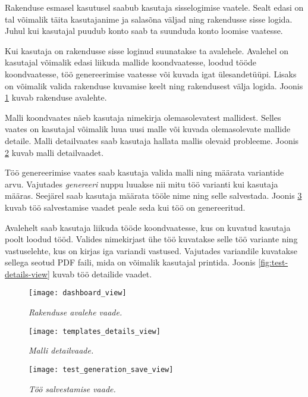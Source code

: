 Rakenduse esmasel kasutusel saabub kasutaja sisselogimise vaatele. Sealt edasi on tal võimalik täita kasutajanime ja salasõna väljad ning rakendusse sisse logida. Juhul kui kasutajal puudub konto saab ta suunduda konto loomise vaatesse.

Kui kasutaja on rakendusse sisse loginud suunatakse ta avalehele. Avalehel on kasutajal võimalik edasi liikuda mallide koondvaatesse, loodud tööde koondvaatesse, töö genereerimise vaatesse või kuvada igat ülesandetüüpi. Lisaks on võimalik valida rakenduse kuvamise keelt ning rakendusest välja logida. Joonis \ref{fig:dashboard-view} kuvab rakenduse avalehte.

Malli koondvaates näeb kasutaja nimekirja olemasolevatest mallidest. Selles vaates on kasutajal võimalik luua uusi malle või kuvada olemasolevate mallide detaile. Malli detailvaates saab kasutaja hallata mallis olevaid probleeme. Joonis \ref{fig:template-details-view} kuvab malli detailvaadet.

Töö genereerimise vaates saab kasutaja valida malli ning määrata variantide arvu. Vajutades \textit{genereeri} nuppu luuakse nii mitu töö varianti kui kasutaja määras. Seejärel saab kasutaja määrata tööle nime ning selle salvestada. Joonis \ref{fig:test-generation-save-view} kuvab töö salvestamise vaadet peale seda kui töö on genereeritud.

Avalehelt saab kasutaja liikuda tööde koondvaatesse, kus on kuvatud kasutaja poolt loodud tööd. Valides nimekirjast ühe töö kuvatakse selle töö variante ning vastuselehte, kus on kirjas iga variandi vastused. Vajutades variandile kuvatakse sellega seotud PDF faili, mida on võimalik kasutajal printida. Joonis \ref{fig:test-details-view} kuvab töö detailide vaadet.

\begin{figure}[H]
    \centering
    \texttt{[image: dashboard\_view]}
    \caption{\emph{Rakenduse avalehe vaade.}}
    \label{fig:dashboard-view}
\end{figure}

\begin{figure}[H]
    \centering
    \texttt{[image: templates\_details\_view]}
    \caption{\emph{Malli detailvaade.}}
    \label{fig:template-details-view}
\end{figure}

\begin{figure}[H]
    \centering
    \texttt{[image: test\_generation\_save\_view]}
    \caption{\emph{Töö salvestamise vaade.}}
    \label{fig:test-generation-save-view}
\end{figure}

